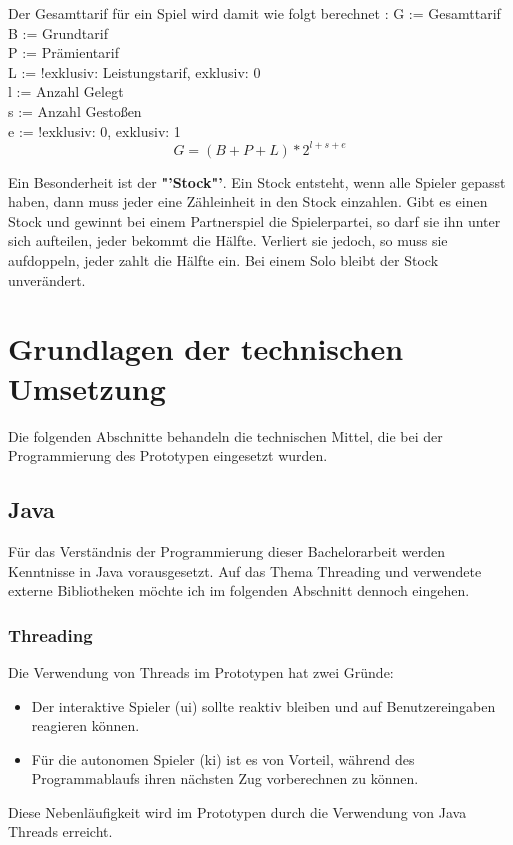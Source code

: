 \documentclass[
							a4paper, 
							11pt, 
							openany, 
							liststotoc,
							parskip=half, 
   							headings=normal
						]{scrreprt}
\begin{document}
{\clearpage

Der Gesamttarif für ein Spiel wird damit wie folgt berechnet \cite[S.60f.]{merschbacher:schafkopf}:\newline
G := Gesamttarif\\
B := Grundtarif\\
P := Prämientarif\\
L := !exklusiv: Leistungstarif, exklusiv: 0\\
l := Anzahl Gelegt\\
s := Anzahl Gestoßen\\
e := !exklusiv: 0, exklusiv: 1
\begin{displaymath}
G = (B + P + L) * 2^{l + s + e}
\end{displaymath}


Ein Besonderheit ist der \textbf{"'Stock"'}. Ein Stock entsteht, wenn alle Spieler gepasst haben, dann muss jeder eine Zähleinheit in den Stock einzahlen.\newline
Gibt es einen Stock und gewinnt bei einem Partnerspiel die Spielerpartei, so darf sie ihn unter sich aufteilen, jeder bekommt die Hälfte. Verliert sie jedoch, so muss sie aufdoppeln, jeder zahlt die Hälfte ein.\newline
Bei einem Solo bleibt der Stock unverändert. \cite[S.80]{merschbacher:schafkopf}
\clearpage

\section{Grundlagen der technischen Umsetzung} \label{se:grundlagen_technik}
Die folgenden Abschnitte behandeln die technischen Mittel, die bei der Programmierung des Prototypen eingesetzt wurden.

\subsection{Java} \label{sse:grundlagen_java}
Für das Verständnis der Programmierung dieser Bachelorarbeit werden Kenntnisse in Java vorausgesetzt. Auf das Thema Threading und verwendete externe Bibliotheken möchte ich im folgenden Abschnitt dennoch eingehen.

\subsubsection{Threading} \label{ssse:grundlagen_java_threading}
Die Verwendung von Threads im Prototypen hat zwei Gründe:
\begin{itemize}
	\item Der interaktive Spieler (\acs{ui}) sollte reaktiv bleiben und auf Benutzereingaben reagieren können.
	\item Für die autonomen Spieler (\acs{ki}) ist es von Vorteil, während des Programmablaufs ihren nächsten Zug vorberechnen zu können.
\end{itemize}
Diese Nebenläufigkeit wird im Prototypen durch die Verwendung von Java Threads erreicht.

}
\end{document}
